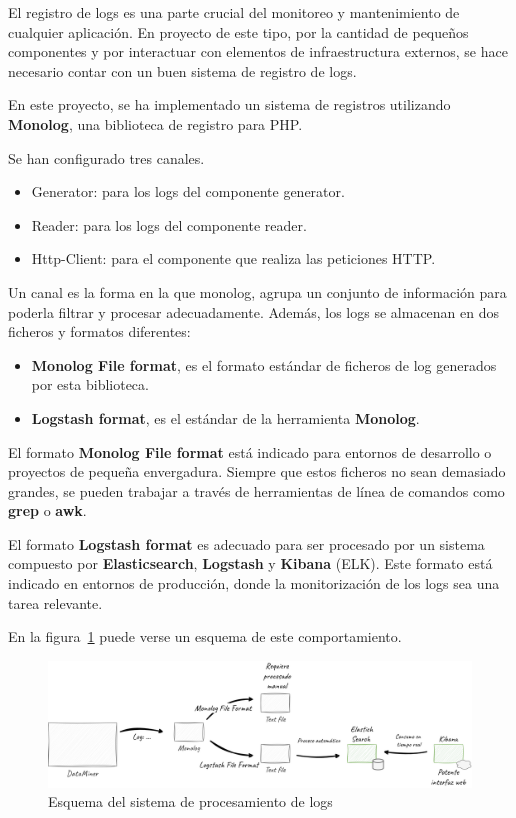 El registro de logs es una parte crucial del monitoreo y mantenimiento de cualquier aplicación.
En proyecto de este tipo, por la cantidad de pequeños componentes y por interactuar con elementos de infraestructura
externos, se hace necesario contar con un buen sistema de registro de logs.

En este proyecto, se ha implementado un sistema de registros utilizando \textbf{Monolog}, una biblioteca de registro
para PHP.

Se han configurado tres canales.

\begin{itemize}
    \item Generator: para los logs del componente generator.
    \item Reader: para los logs del componente reader.
    \item Http-Client: para el componente que realiza las peticiones HTTP.
\end{itemize}

Un canal es la forma en la que monolog, agrupa un conjunto de información para poderla filtrar y procesar adecuadamente.
Además, los logs se almacenan en dos ficheros y formatos diferentes:

\begin{itemize}
    \item \textbf{Monolog File format}, es el formato estándar de ficheros de log generados por esta biblioteca.
    \item \textbf{Logstash format}, es el estándar de la herramienta \textbf{Monolog}.
\end{itemize}

El formato \textbf{Monolog File format} está indicado para entornos de desarrollo o proyectos de pequeña envergadura.
Siempre que estos ficheros no sean demasiado grandes, se pueden trabajar a través de herramientas de línea de comandos
como \textbf{grep} o \textbf{awk}.

El formato \textbf{Logstash format} es adecuado para ser procesado por un sistema compuesto por
\textbf{Elasticsearch}, \textbf{Logstash} y \textbf{Kibana} (ELK).
Este formato está indicado en entornos de producción, donde la monitorización de los logs sea una tarea relevante.

En la figura~\ref{fig:chapter_4.logs_overview} puede verse un esquema de este comportamiento.

\begin{figure}[ht]
    \begin{center}
        \includegraphics[width=\textwidth]{./chapter/4/images/chapter_4.logs_overview}
        \caption{Esquema del sistema de procesamiento de logs}
        \label{fig:chapter_4.logs_overview}
    \end{center}
\end{figure}